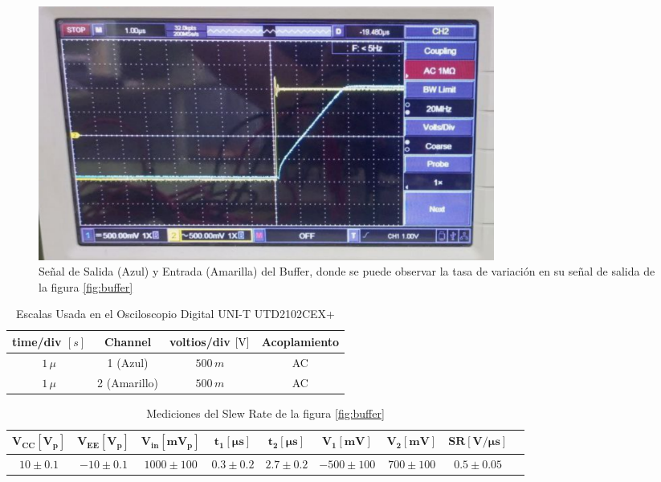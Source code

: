         \begin{figure}[H]
            \centering
            \renewcommand{\figurename}{Imagen}
            \setcounter{figure}{11}
            \includegraphics[width=15cm]{Imagenes/exp_sr.png}
            \caption{Señal de Salida (Azul) y Entrada (Amarilla) del Buffer, donde se puede observar la tasa de variación en su señal de salida de la figura \ref{fig:buffer}}
            \label{fig:exp_sr}
        \end{figure}

        \begin{table}[H]
            \centering
            \begin{tabular}{|c|c|c|c|}
                \hline
                \textbf{time/div} $[s]$ & \textbf{Channel} & \textbf{voltios/div $[\volt]$} & \textbf{Acoplamiento} \\ \hline
                $1 \, \mu$ & 1 (Azul) &  $500 \, m $ & AC \\ \hline
                $1 \, \mu$ & 2 (Amarillo)  &   $500 \, m $ & AC \\ \hline  
            \end{tabular}
            \caption{Escalas Usada en el Osciloscopio Digital UNI-T UTD2102CEX+}
            \label{tab:escala_exp_sr}
        \end{table}

        \begin{table}[H]
          \centering
          \begin{tabular}{|c|c|c|c|c|c|c|c|c|}
            \hline
            $\mathbf{V_{CC} [V_p]}$ & $\mathbf{V_{EE} [V_p]}$ & $\mathbf{V_{in} [mV_p]}$ & $\mathbf{t_1 [\mu s]}$ & $\mathbf{t_2 [\mu s]}$ & $\mathbf{V_1 [mV]}$ & $\mathbf{V_2 [mV]}$ & $\mathbf{SR [V/\mu s]}$ \\
            \hline
            $10 \pm 0.1$ & $-10 \pm 0.1$ & $1000 \pm 100$ & $0.3 \pm 0.2$ & $2.7 \pm 0.2$ & $-500 \pm 100$ & $700 \pm 100$ & $0.5 \pm 0.05$ \\
            \hline
          \end{tabular}
          \caption{Mediciones del Slew Rate de la figura \ref{fig:buffer}}
          \label{tab:exp_sr}
        \end{table}

